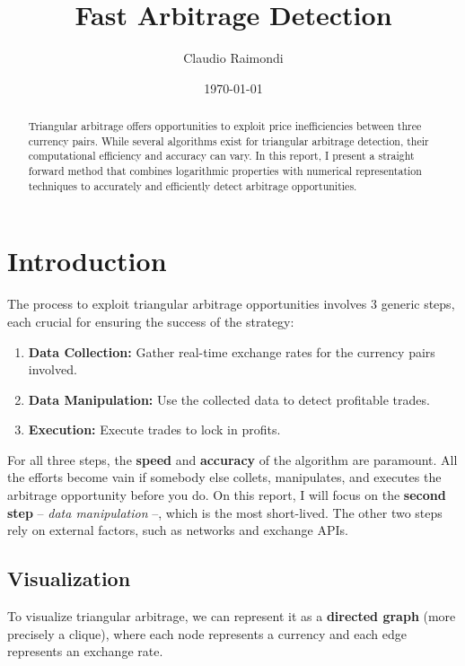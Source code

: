 \documentclass[11pt]{article}
\begin{document}
\title{Fast Arbitrage Detection}
\author{Claudio Raimondi}
\date{\today}
\maketitle

\begin{abstract}
Triangular arbitrage offers opportunities to exploit price inefficiencies between three currency pairs. While several algorithms exist for triangular arbitrage detection, their computational efficiency and accuracy can vary. In this report, I present a straight forward method that combines logarithmic properties with numerical representation techniques to accurately and efficiently detect arbitrage opportunities.
\end{abstract}

\tableofcontents

\section{Introduction}
The process to exploit triangular arbitrage opportunities involves 3 generic steps, each crucial for ensuring the success of the strategy:
\begin{enumerate}
    \item \textbf{Data Collection:} Gather real-time exchange rates for the currency pairs involved.
    \item \textbf{Data Manipulation:} Use the collected data to detect profitable trades.
    \item \textbf{Execution:} Execute trades to lock in profits.
\end{enumerate}
For all three steps, the \textbf{speed} and \textbf{accuracy} of the algorithm are paramount. All the efforts become vain if somebody else collets, manipulates, and executes the arbitrage opportunity before you do.
On this report, I will focus on the \textbf{second step} -- \textit{data manipulation} --, which is the most short-lived. The other two steps rely on external factors, such as networks and exchange APIs.

\subsection{Visualization}
To visualize triangular arbitrage, we can represent it as a \textbf{directed graph} (more precisely a clique), where each node represents a currency and each edge represents an exchange rate.
\end{document}
